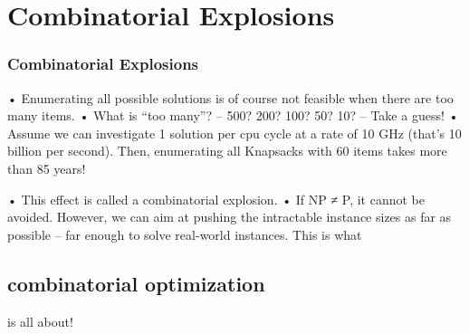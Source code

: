 \section{Combinatorial Explosions}
\begin{frame}
\frametitle{Combinatorial Explosions}
• Enumerating all possible solutions is of course not feasible
when there are too many items.
• What is “too many”?
– 500? 200? 100? 50? 10?
– Take a guess!
• Assume we can investigate 1 solution per cpu cycle at a
rate of 10 GHz (that’s 10 billion per second). Then,
enumerating all Knapsacks with 60 items takes more than
85 years!
\end{frame}
• This effect is called a combinatorial explosion.
• If NP ≠ P, it cannot be avoided. However, we can aim at
pushing the intractable instance sizes as far as possible – far enough to solve real-world instances. This is what
\subsection{combinatorial optimization} is all about!

